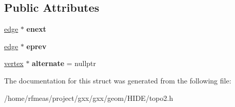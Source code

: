\subsection*{Public Attributes}
\begin{DoxyCompactItemize}
\item 
\hyperlink{structgxx_1_1topo2_1_1edge}{edge} $\ast$ {\bfseries enext}\hypertarget{structgxx_1_1topo2_1_1vertex_ae29bf3040cbc99e5ef4b31639f91cb87}{}\label{structgxx_1_1topo2_1_1vertex_ae29bf3040cbc99e5ef4b31639f91cb87}

\item 
\hyperlink{structgxx_1_1topo2_1_1edge}{edge} $\ast$ {\bfseries eprev}\hypertarget{structgxx_1_1topo2_1_1vertex_a0e02cbadbd6da5da0ac4fd9cb001252c}{}\label{structgxx_1_1topo2_1_1vertex_a0e02cbadbd6da5da0ac4fd9cb001252c}

\item 
\hyperlink{structgxx_1_1topo2_1_1vertex}{vertex} $\ast$ {\bfseries alternate} = nullptr\hypertarget{structgxx_1_1topo2_1_1vertex_ae94412f274465991f1e38b3695148f3f}{}\label{structgxx_1_1topo2_1_1vertex_ae94412f274465991f1e38b3695148f3f}

\end{DoxyCompactItemize}


The documentation for this struct was generated from the following file\+:\begin{DoxyCompactItemize}
\item 
/home/rfmeas/project/gxx/gxx/geom/\+H\+I\+D\+E/topo2.\+h\end{DoxyCompactItemize}
